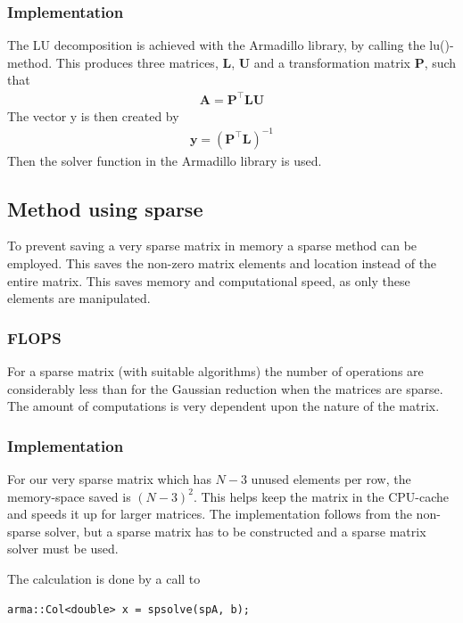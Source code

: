 \documentclass[11pt,a4paper,english,draft]{article}
\numberwithin{equation}{section}
\newcommand{\ve}[1]{\mathbf{#1}} %
\newcommand{\trans}[1]{#1^\top}
\begin{document}
\subsubsection{Implementation}

The LU decomposition is achieved with the Armadillo library, by calling
the lu()-method. This produces three matrices, $\ve{L}$, $\ve{U}$ and a transformation
matrix $\ve{P}$, such that
\begin{gather}
\ve{A} = \ve{ \trans{P}LU }
\end{gather}
The vector y is then created by
\begin{gather}
\ve{y} = \left( \ve{ \trans{P}L }  \right)^{-1}
\end{gather}
Then the solver function in the Armadillo library is used.

\subsection{Method using sparse}

To prevent saving a very sparse matrix in memory a sparse method can be employed.
This saves the non-zero matrix elements and location instead of the 
entire matrix. This saves memory and computational speed, as only these
elements are manipulated.

\subsubsection{FLOPS}

For a sparse matrix (with suitable algorithms) the number of operations are considerably
less than for the Gaussian reduction when the matrices are sparse.
The amount of computations is very dependent upon the nature of the matrix.

\subsubsection{Implementation}

For our very sparse matrix which has $N-3$ unused elements per row, the
memory-space saved is $(N-3)^2$. This helps keep the matrix in the 
CPU-cache and speeds it up for larger matrices. The implementation follows
from the non-sparse solver, but a sparse matrix has to be constructed and 
a sparse matrix solver must be used.

The calculation is done by a call to
\begin{lstlisting}
arma::Col<double> x = spsolve(spA, b);
\end{lstlisting}
\end{document}
